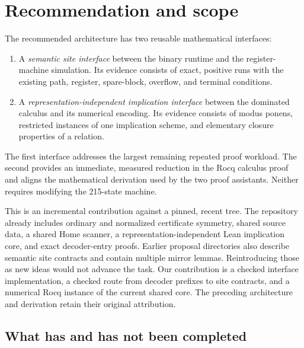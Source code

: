 \documentclass[11pt,letterpaper]{article}
\theoremstyle{definition}\newtheorem{definition}[theorem]{Definition}
\theoremstyle{remark}\newtheorem{remark}[theorem]{Remark}
\begin{document}
\section{Recommendation and scope}

The recommended architecture has two reusable mathematical interfaces:

\begin{enumerate}
\item A \emph{semantic site interface} between the binary runtime and the register-machine simulation. Its evidence consists of exact, positive runs with the existing path, register, spare-block, overflow, and terminal conditions.
\item A \emph{representation-independent implication interface} between the dominated calculus and its numerical encoding. Its evidence consists of modus ponens, restricted instances of one implication scheme, and elementary closure properties of a relation.
\end{enumerate}

The first interface addresses the largest remaining repeated proof workload. The second provides an immediate, measured reduction in the Rocq calculus proof and aligns the mathematical derivation used by the two proof assistants. Neither requires modifying the 215-state machine.

This is an incremental contribution against a pinned, recent tree. The repository already includes ordinary and normalized certificate symmetry, shared source data, a shared Home scanner, a representation-independent Lean implication core, and exact decoder-entry proofs. Earlier proposal directories also describe semantic site contracts and contain multiple mirror lemmas. Reintroducing those as new ideas would not advance the task. Our contribution is a checked interface implementation, a checked route from decoder prefixes to site contracts, and a numerical Rocq instance of the current shared core. The preceding architecture and derivation retain their original attribution.\cite{formal,phase9,rho8cd,priorcontracts}

\subsection{What has and has not been completed}
\end{document}
